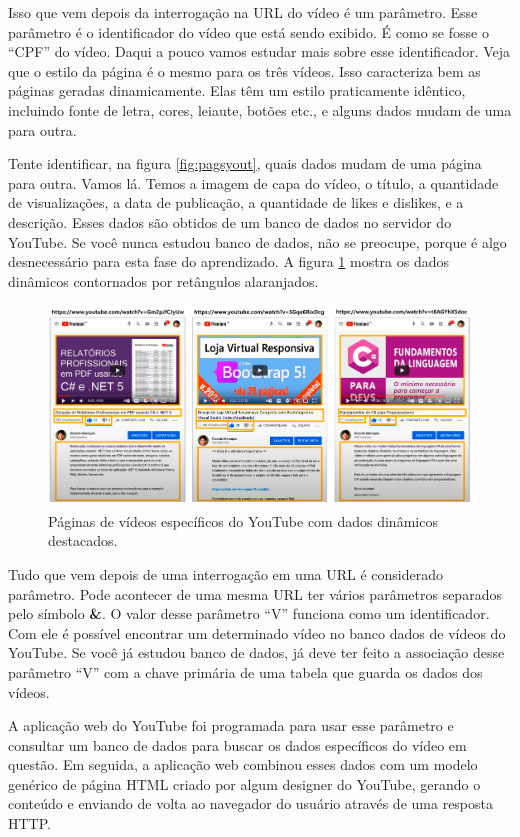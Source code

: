 Isso que vem depois da interrogação na URL do vídeo é um parâmetro. Esse parâmetro é o identificador do vídeo que está sendo exibido. É como se fosse o ``CPF'' do vídeo. Daqui a pouco vamos estudar mais sobre esse identificador. Veja que o estilo da página é o mesmo para os três vídeos. Isso caracteriza bem as páginas geradas dinamicamente. Elas têm um estilo praticamente idêntico, incluindo fonte de letra, cores, leiaute, botões etc., e alguns dados mudam de uma para outra.

Tente identificar, na figura \ref{fig:pagsyout}, quais dados mudam de uma página para outra. Vamos lá. Temos a imagem de capa do vídeo, o título, a quantidade de visualizações, a data de publicação, a quantidade de likes e dislikes, e a descrição. Esses dados são obtidos de um banco de dados no servidor do YouTube. Se você nunca estudou banco de dados, não se preocupe, porque é algo desnecessário para esta fase do aprendizado. A figura \ref{fig:pagsyoutmarcado} mostra os dados dinâmicos contornados por retângulos alaranjados.

\begin{figure}[htbp!]
    \centering
    \includegraphics[width=1\textwidth]{Images/chapter01/pags_youtube2.png}
    \caption{Páginas de vídeos específicos do YouTube com dados dinâmicos destacados.}
    \label{fig:pagsyoutmarcado}
\end{figure}

Tudo que vem depois de uma interrogação em uma URL é considerado parâmetro. Pode acontecer de uma mesma URL ter vários parâmetros separados pelo símbolo \textbf{\&}. O valor desse parâmetro ``V'' funciona como um identificador. Com ele é possível encontrar um determinado vídeo no banco dados de vídeos do YouTube. Se você já estudou banco de dados, já deve ter feito a associação desse parâmetro ``V'' com a chave primária de uma tabela que guarda os dados dos vídeos.

A aplicação web do YouTube foi programada para usar esse parâmetro e consultar um banco de dados para buscar os dados específicos do vídeo em questão. Em seguida, a aplicação web combinou esses dados com um modelo genérico de página HTML criado por algum designer do YouTube, gerando o conteúdo e enviando de volta ao navegador do usuário através de uma resposta HTTP. 

